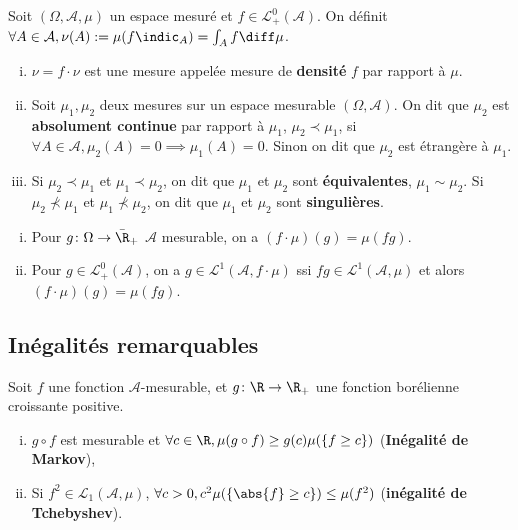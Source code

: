 	\begin{defn}
		Soit $(\Omega,\mathcal{A},\mu)$ un espace mesuré et $f \in \mathcal{L}_+^0(\mathcal{A})$.
		On définit $\forall A \in \mathcal{A}, \nu(A) := \mu(f \indic_A) = \int_A f \diff \mu$.
		\begin{enumerate}[(i)]
			\item $\nu = f \cdot \nu$ est une mesure appelée mesure de \textbf{densité} $f$ par rapport à $\mu$.
			\item Soit $\mu_1, \mu_2$ deux mesures sur un espace mesurable $(\Omega,\mathcal{A})$.
				On dit que $\mu_2$ est \textbf{absolument continue} par rapport à $\mu_1$, $\mu_2 \prec \mu_1$, si $\forall A \in \mathcal{A}, \mu_2(A) = 0 \implies \mu_1(A) = 0$.
				Sinon on dit que $\mu_2$ est étrangère à $\mu_1$.
			\item Si $\mu_2 \prec \mu_1$ et $\mu_1 \prec \mu_2$, on dit que $\mu_1$ et $\mu_2$ sont \textbf{équivalentes}, $\mu_1 \sim \mu_2$.
				Si $\mu_2 \not\prec \mu_1$ et $\mu_1 \not\prec \mu_2$, on dit que $\mu_1$ et $\mu_2$ sont \textbf{singulières}.
		\end{enumerate}
	\end{defn}

	\begin{thm}
		\begin{enumerate}[(i)]
			\item Pour $g \colon \Omega \to \Bar\R_+$ $\mathcal{A}$ mesurable, on a $(f \cdot \mu)(g) = \mu(fg)$.
			\item Pour $g \in \mathcal{L}_+^0(\mathcal{A})$, on a $g \in \mathcal{L}^1(\mathcal{A}, f \cdot \mu)$ ssi $fg \in \mathcal{L}^1(\mathcal{A}, \mu)$ et alors $(f \cdot \mu)(g) = \mu(fg)$.
		\end{enumerate}
	\end{thm}


\subsection{Inégalités remarquables}

	\begin{thm}
		Soit $f$ une fonction $\mathcal{A}$-mesurable, et $g \colon \R \to \R_+$ une fonction borélienne croissante positive.
		\begin{enumerate}[(i)]
			\item $g \circ f$ est mesurable et $\forall c \in \R, \mu(g \circ f) \geq g(c) \mu(\{ f \geq c \})$ (\textbf{Inégalité de Markov}),
			\item Si $f^2 \in \mathcal{L}_1(\mathcal{A},\mu)$, $\forall c > 0, c^2 \mu(\{ \abs{f} \geq c \}) \leq \mu(f^2)$ (\textbf{inégalité de Tchebyshev}).
		\end{enumerate}
	\end{thm}



